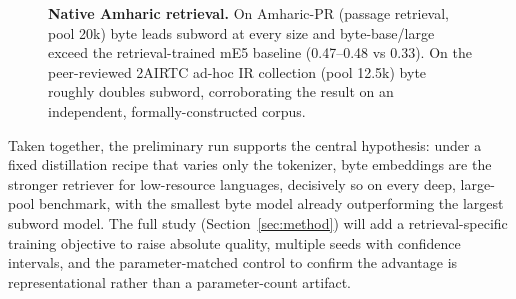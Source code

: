 \begin{figure}[htbp]
\centering
{}
\caption{\textbf{Native Amharic retrieval.} On Amharic-PR (passage retrieval, pool 20k) byte leads
subword at every size and byte-base/large exceed the retrieval-trained mE5 baseline (0.47--0.48 vs
0.33). On the peer-reviewed 2AIRTC ad-hoc IR collection (pool 12.5k) byte roughly doubles subword,
corroborating the result on an independent, formally-constructed corpus.}
\label{fig:amharic}
\end{figure}

\noindent
Taken together, the preliminary run supports the central hypothesis: under a fixed distillation recipe
that varies only the tokenizer, byte embeddings are the stronger retriever for low-resource languages,
decisively so on every deep, large-pool benchmark, with the smallest byte model already outperforming
the largest subword model. The full study (Section~\ref{sec:method}) will add a retrieval-specific
training objective to raise absolute quality, multiple seeds with confidence intervals, and the
parameter-matched control to confirm the advantage is representational rather than a parameter-count
artifact.

\FloatBarrier
